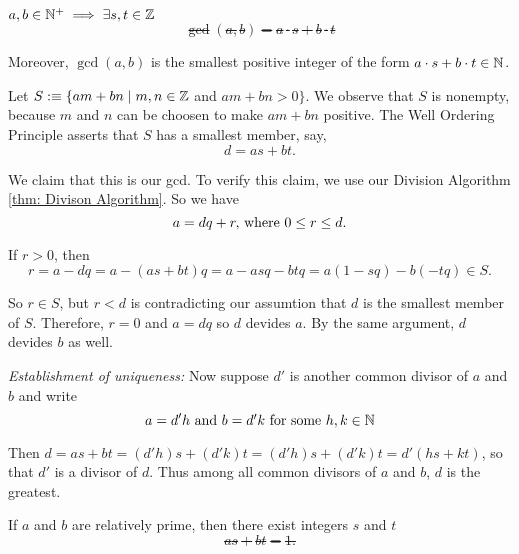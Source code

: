\begin{thm}
  $a,b \in \mathbb{N}^+ \implies \exists s,t \in \mathbb{Z}$ \st
  \begin{equation}
    \gcd(a,b)=a\cdot s+b \cdot t
  \end{equation}

  Moreover, $\gcd(a,b)$ is the smallest positive integer  of the form $a\cdot s+b \cdot t \in \mathbb{N}$.
\end{thm}
\begin{prf}
  Let $S :\equiv \{am + bn \mid m,n \in \mathbb{Z} $ and $am+bn >0 \}$. We observe that $S$ is nonempty, because $m$ and $n$ can be choosen to make $am + bn$ positive. The Well Ordering Principle asserts that $S$ has a smallest member, say,
  \begin{equation}
    d=as+bt.
  \end{equation}

  We claim that this is our gcd. To verify this claim, we use our Division Algorithm \ref{thm: Divison Algorithm}. So we have
  \begin{equation}
    a = dq + r, $ where $ 0 \leq r \leq d.
  \end{equation}

  If $r > 0$, then
  \begin{equation}
    r = a-dq = a-(as+bt)q=a-asq-btq=a(1-sq)-b(-tq)\in S.
  \end{equation}

  So $r\in S$, but $r<d$ is contradicting our assumtion that $d$ is the smallest member of $S$. Therefore, $r=0$ and $a=dq$ so $d$ devides $a$. By the same argument, $d$ devides $b$ as well.

  \bigbreak

  \emph{Establishment of uniqueness:} Now suppose $d'$ is another common divisor of $a$ and $b$ and write
  \begin{equation}
    a = d'h $ and $ b=d'k $ for some $ h,k \in \nat
  \end{equation}

  Then $d=as + bt = (d'h)s + (d'k)t = (d'h)s + (d'k)t = d'(hs + kt)$, so that $d'$ is a divisor of $d$. Thus among all common divisors of $a$ and $b$, $d$ is the greatest.
\end{prf}
\begin{corollary}
  If $a$ and $b$ are relatively prime, then there exist integers $s$ and $t$ \st
  \begin{equation}
    as + bt = 1.
  \end{equation}
\end{corollary}

